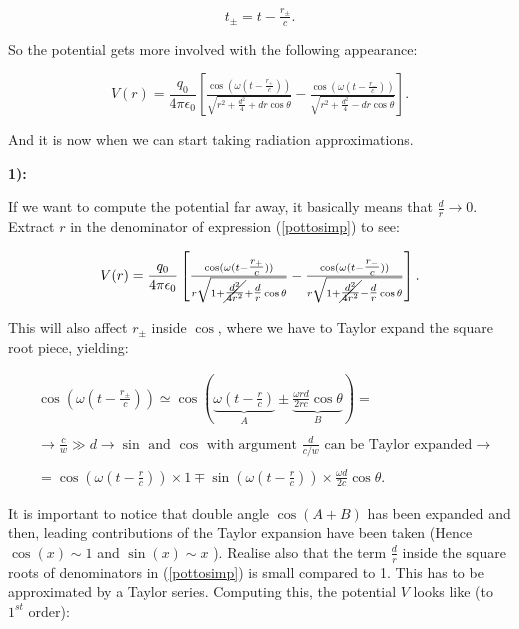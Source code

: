 \begin{equation}
	t_{\pm}= t - \tfrac{r_{\pm}}{c}.
\end{equation}

So the potential gets more involved with the following appearance:

\begin{equation}\label{pottosimp}
	V(r)= \frac{q_{0}}{4\pi \epsilon_{0}}\left[\tfrac{\cos (\omega (t -\tfrac{r_{+}}{c}))}{\sqrt{r^{2}+\tfrac{d^{2}}{4}+d r \cos\theta}} - \tfrac{\cos (\omega (t -\tfrac{r_{-}}{c}))}{\sqrt{r^{2}+\tfrac{d^{2}}{4}-d r \cos\theta}}\right].
\end{equation}

And it is now when we can start taking radiation approximations.

\textbf{1):}

If we want to compute the potential far away, it basically means that $\tfrac{d}{r} \rightarrow 0$. Extract $r$ in the denominator of expression (\ref{pottosimp}) to see:

\begin{equation}
	V(r)= \frac{q_{0}}{4\pi \epsilon_{0}}\left[\tfrac{\cos (\omega (t -\tfrac{r_{+}}{c}))}{r \sqrt{1+\cancel{\tfrac{d^{2}}{4 r^{2}}}+ \tfrac{d}{r} \cos\theta}} - \tfrac{\cos (\omega (t -\tfrac{r_{-}}{c}))}{r \sqrt{1+\cancel{\tfrac{d^{2}}{4 r^{2}}}-\tfrac{d}{r} \cos\theta}}\right].
\end{equation}

This will also affect $r_{\pm}$ inside $\cos$, where we have to Taylor expand the square root piece, yielding:

\begin{equation}
	\begin{split}
		&\cos \left(\omega\left(t - \tfrac{r_{\pm}}{c}\right)\right)\simeq 	\cos \left(\underbrace{\omega\left(t - \tfrac{r}{c}\right)}_{A} \pm \underbrace{\tfrac{\omega r d}{2rc}\cos\theta}_{B} \right)=\\
		&\\
		& \rightarrow \tfrac{c}{w} \gg d \rightarrow \text{$\sin$ and $\cos$ with argument $\tfrac{d}{c/w}$ can be Taylor expanded}\rightarrow\\
		&\\
		&= \cos \left(\omega\left(t - \tfrac{r}{c}\right)\right) \times 1 \mp \sin \left(\omega\left(t - \tfrac{r}{c}\right)\right) \times \tfrac{\omega d}{2 c}\cos\theta.
	\end{split}
\end{equation}

It is important to notice that double angle $\cos (A + B)$ has been expanded and then, leading contributions of the Taylor expansion have been taken (Hence $\cos(x)\sim1$ and $\sin(x) \sim  x $ ). Realise also that the term $\tfrac{d}{r}$ inside the square roots of denominators in (\ref{pottosimp}) is small compared to 1. This has to be approximated by a Taylor series. Computing this, the potential $V$ looks like (to $1^{st}$ order):

